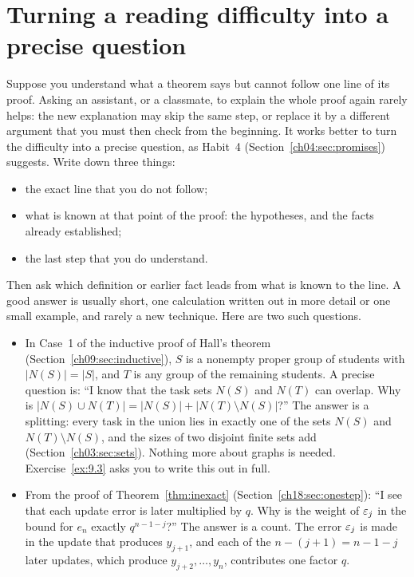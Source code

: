 \section{Turning a reading difficulty into a precise question}\label{appC:sec:question}
Suppose you understand what a theorem says but cannot follow one line of its proof. Asking an assistant, or a classmate, to explain the whole proof again rarely helps: the new explanation may skip the same step, or replace it by a different argument that you must then check from the beginning. It works better to turn the difficulty into a precise question, as Habit~4 (Section~\ref{ch04:sec:promises}) suggests. Write down three things:
\begin{itemize}
\item the exact line that you do not follow;
\item what is known at that point of the proof: the hypotheses, and the facts already established;
\item the last step that you do understand.
\end{itemize}
Then ask which definition or earlier fact leads from what is known to the line. A good answer is usually short, one calculation written out in more detail or one small example, and rarely a new technique. Here are two such questions.
\begin{itemize}
\item In Case~1 of the inductive proof of Hall's theorem (Section~\ref{ch09:sec:inductive}), $S$ is a nonempty proper group of students with $|N(S)|=|S|$, and $T$ is any group of the remaining students. A precise question is: ``I know that the task sets $N(S)$ and $N(T)$ can overlap. Why is $|N(S)\cup N(T)|=|N(S)|+|N(T)\setminus N(S)|$?'' The answer is a splitting: every task in the union lies in exactly one of the sets $N(S)$ and $N(T)\setminus N(S)$, and the sizes of two disjoint finite sets add (Section~\ref{ch03:sec:sets}). Nothing more about graphs is needed. Exercise~\ref{ex:9.3} asks you to write this out in full.
\item From the proof of Theorem~\ref{thm:inexact} (Section~\ref{ch18:sec:onestep}): ``I see that each update error is later multiplied by $q$. Why is the weight of $\varepsilon_j$ in the bound for $e_n$ exactly $q^{n-1-j}$?'' The answer is a count. The error $\varepsilon_j$ is made in the update that produces $y_{j+1}$, and each of the $n-(j+1)=n-1-j$ later updates, which produce $y_{j+2},\ldots,y_n$, contributes one factor $q$.
\end{itemize}

